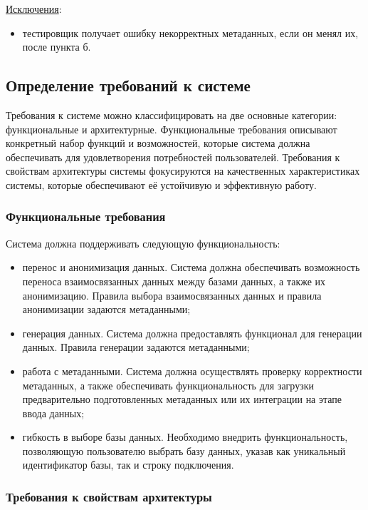 \underline{Исключения}:

\begin{itemize}
    \item тестировщик получает ошибку некорректных метаданных, если он менял их, после пункта б.
\end{itemize}


\subsection{Определение требований к системе}

Требования к системе можно классифицировать на две основные категории: функциональные и архитектурные. Функциональные требования описывают конкретный набор функций и возможностей, которые система должна обеспечивать для удовлетворения потребностей пользователей. Требования к свойствам архитектуры системы фокусируются на качественных характеристиках системы, которые обеспечивают её устойчивую и эффективную работу.

\subsubsection{Функциональные требования}

Система должна поддерживать следующую функциональность:

\begin{itemize}
    \item перенос и анонимизация данных. Система должна обеспечивать возможность переноса взаимосвязанных данных между базами данных, а также их анонимизацию. Правила выбора взаимосвязанных данных и правила анонимизации задаются метаданными;
    \item генерация данных. Система должна предоставлять функционал для генерации данных. Правила генерации задаются метаданными;
    \item работа с метаданными. Система должна осуществлять проверку корректности метаданных, а также обеспечивать функциональность для загрузки предварительно подготовленных метаданных или их интеграции на этапе ввода данных;
    \item гибкость в выборе базы данных. Необходимо внедрить функциональность, позволяющую пользователю выбрать базу данных, указав как уникальный идентификатор базы, так и строку подключения.
\end{itemize}

\subsubsection{Требования к свойствам архитектуры}

